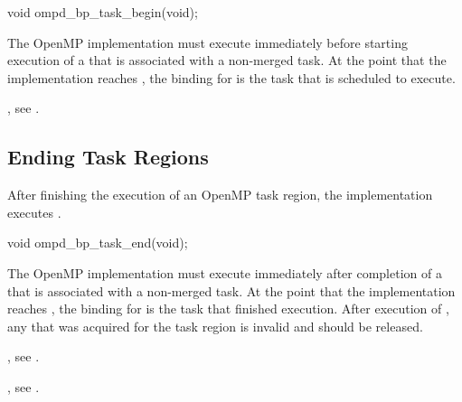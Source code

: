\format
\begin{cspecific}
\begin{ompSyntax}
void ompd_bp_task_begin(void);
\end{ompSyntax}
\end{cspecific}

\descr
The OpenMP implementation must execute  
immediately before starting execution of a  that is
associated with a non-merged task. At the point that the implementation 
reaches , the binding for 
 is the task that is scheduled to execute.

\begin{crossrefs}
\item {}, 
see .
\end{crossrefs}



\subsection{Ending Task Regions}
\label{subsubsec:ompd_bp_task_end}

\summary
After finishing the execution of an OpenMP task region, 
the implementation executes .

\format
\begin{cspecific}
\begin{ompSyntax}
void ompd_bp_task_end(void);
\end{ompSyntax}
\end{cspecific}

\descr
The OpenMP implementation must execute  immediately
after completion of a  that is associated with a 
non-merged task. At the point that the implementation reaches 
, the binding for  
is the task that finished execution. After execution of , 
any  that was acquired for the task region is invalid and 
should be released.

\begin{crossrefs}
\item {}, 
see .

\item {}, see .
\end{crossrefs}



